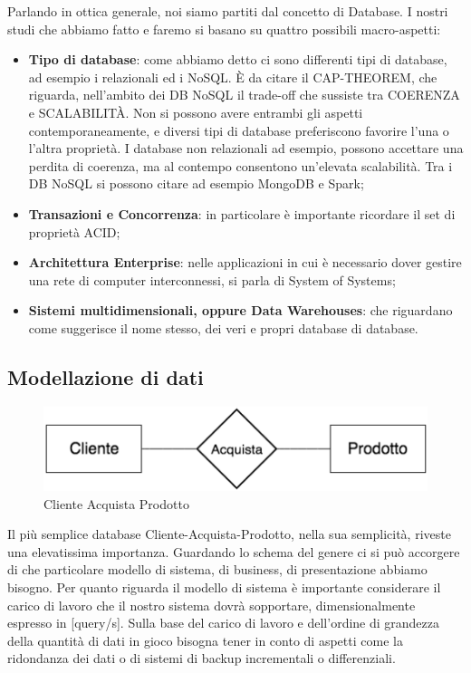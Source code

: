 Parlando in ottica generale, noi siamo partiti dal concetto di Database. I nostri studi che abbiamo fatto e faremo si basano su quattro possibili macro-aspetti:

\begin{itemize}

\item{\textbf{Tipo di database​}}: come abbiamo detto ci sono differenti tipi di database, ad esempio i relazionali ed i NoSQL. \`E da citare il CAP-THEOREM, che riguarda, nell’ambito dei DB NoSQL il trade-off che sussiste tra COERENZA e SCALABILIT\`A. Non si possono avere entrambi gli aspetti contemporaneamente, e diversi tipi di database preferiscono favorire l'una o l'altra proprietà. I database non relazionali ad esempio, possono accettare una perdita di coerenza, ma al contempo consentono un'elevata scalabilità. Tra i DB NoSQL si possono citare ad esempio MongoDB e Spark;
\item{\textbf{Transazioni e Concorrenza}}: in particolare è importante ricordare il set di proprietà ACID;
\item{\textbf{Architettura Enterprise}}: nelle applicazioni in cui è necessario dover gestire una rete di computer interconnessi, si parla di System of Systems;
\item{\textbf{Sistemi multidimensionali, oppure Data Warehouses​}}: che riguardano come suggerisce il nome stesso, dei veri e propri database di database.  

\end{itemize}

\subsection{Modellazione di dati}

\begin{center}
\begin{figure}[H]
\centering
\includegraphics[scale=1]{figures/cliente_acquista_prodotto2.png}
\caption{Cliente Acquista Prodotto} 
\end{figure}
\end{center}

Il più semplice database Cliente-Acquista-Prodotto, nella sua semplicità, riveste una elevatissima importanza. Guardando lo schema del genere ci si può accorgere di che particolare modello di sistema, di business, di presentazione abbiamo bisogno. Per quanto riguarda il modello di sistema è importante considerare il carico di lavoro che il nostro sistema dovrà sopportare, dimensionalmente espresso in [query/s]. Sulla base del carico di lavoro e dell'ordine di grandezza della quantità di dati in gioco bisogna tener in conto di aspetti come la ridondanza dei dati o di sistemi di backup incrementali o differenziali.  

